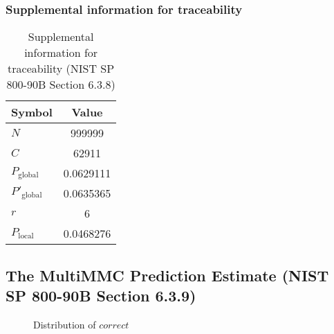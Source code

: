 \documentclass[a3paper,xelatex,english]{bxjsarticle}
\begin{document}
\subsubsection{Supplemental information for traceability}
\renewcommand{\arraystretch}{1.8}
\begin{table}[h]
\caption{Supplemental information for traceability (NIST SP 800-90B Section 6.3.8)}
\begin{center}
\begin{tabular}{|l|c|}
\hline 
\rowcolor{anotherlightblue} %
Symbol				& Value \\ \hline 
$N$				& 999999\\ \hline 
$C$				& 62911\\ \hline 
$P_{\textrm{global}}$				& 0.0629111\\ \hline 
$P'_{\textrm{global}}$			& 0.0635365\\ \hline 
$r$				& 6\\ \hline 
$P_{\textrm{local}}$ 			& 0.0468276\\ \hline
\end{tabular}
\end{center}
\end{table}
\renewcommand{\arraystretch}{1.4}
\clearpage
\subsection{The MultiMMC Prediction Estimate (NIST SP 800-90B Section 6.3.9)}\label{sec:NonBinary639}

\begin{figure}[htbp]
\centering

\caption{Distribution of $correct$}
\end{figure}
\end{document}
